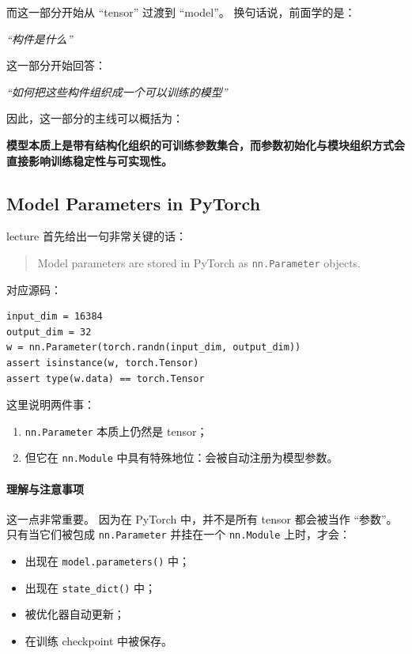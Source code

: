 \documentclass[a4paper,UTF8]{article}
\numberwithin{equation}{section}
\begin{document}
而这一部分开始从 ``tensor'' 过渡到 ``model''。  
换句话说，前面学的是：
\begin{center}
\emph{“构件是什么”}
\end{center}
这一部分开始回答：
\begin{center}
\emph{“如何把这些构件组织成一个可以训练的模型”}
\end{center}

因此，这一部分的主线可以概括为：
\begin{center}
\textbf{模型本质上是带有结构化组织的可训练参数集合，而参数初始化与模块组织方式会直接影响训练稳定性与可实现性。}
\end{center}

\subsection{Model Parameters in PyTorch}

lecture 首先给出一句非常关键的话：
\begin{quote}
Model parameters are stored in PyTorch as \verb|nn.Parameter| objects.
\end{quote}

对应源码：
\begin{verbatim}
input_dim = 16384
output_dim = 32
w = nn.Parameter(torch.randn(input_dim, output_dim))
assert isinstance(w, torch.Tensor)
assert type(w.data) == torch.Tensor
\end{verbatim}

这里说明两件事：

\begin{enumerate}
    \item \verb|nn.Parameter| 本质上仍然是 tensor；
    \item 但它在 \verb|nn.Module| 中具有特殊地位：会被自动注册为模型参数。
\end{enumerate}

\paragraph{理解与注意事项}
这一点非常重要。  
因为在 PyTorch 中，并不是所有 tensor 都会被当作 ``参数''。只有当它们被包成 \verb|nn.Parameter| 并挂在一个 \verb|nn.Module| 上时，才会：
\begin{itemize}
    \item 出现在 \verb|model.parameters()| 中；
    \item 出现在 \verb|state_dict()| 中；
    \item 被优化器自动更新；
    \item 在训练 checkpoint 中被保存。
\end{itemize}
\end{document}
